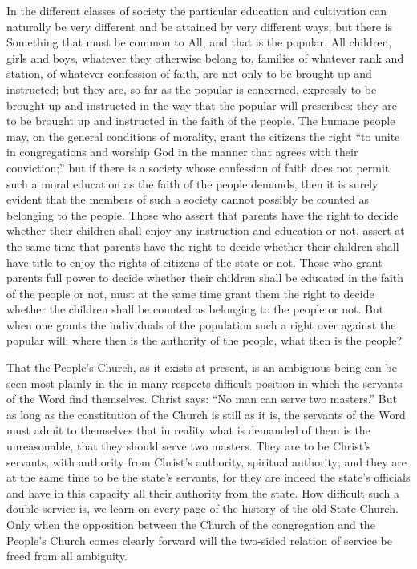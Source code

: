 \documentclass[12pt,a4paper,openany]{book}
\newcommand{\opage}[1]{\marginnote{\footnotesize\textit{[#1]}}}
\begin{document}
In the different classes of society the particular
education and cultivation can naturally be very different
and be attained by very different ways; but there
is Something that must be common to All, and that is the
popular. All children, girls and boys, whatever they otherwise belong to,
families of whatever rank and station,
of whatever confession of faith, are not only to be
brought up and instructed; but they are, so far as the popular
is concerned, expressly to be brought up and instructed in
the way that the popular will prescribes: they are to be brought up
and instructed in the faith of the people. The humane people
may, on the general conditions of morality, grant
the citizens the right ``to unite in congregations and
\setcounter{footnote}{0}%
\opage{111}worship God in the manner that agrees with their
conviction;'' but if there is a society whose
confession of faith does not permit such a moral education
as the faith of the people demands, then it is surely
evident that the members of such a society
cannot possibly be counted as belonging to the people. Those who assert that
parents have the right to decide whether their
children shall enjoy any instruction and education
or not, assert at the same time that parents have
the right to decide whether their children shall have
title to enjoy the rights of citizens of the state or
not. Those who grant parents full power to
decide whether their children shall be educated in the faith of the people
or not, must at the same time grant them the right to decide
whether the children shall be counted as belonging to the people or not.
But when one grants the individuals of the population such
a right over against the popular will: where then is
the authority of the people, what then is the people?

That the People's Church, as it exists at present,
is an ambiguous being can be seen most plainly
in the in many respects difficult position in which
the servants of the Word find themselves. Christ says: ``No man
can serve two masters.'' But as long as the constitution of the Church
is still as it is, the servants of the Word must
admit to themselves that in reality what is demanded of them
is the unreasonable, that they should serve two masters.
They are to be Christ's servants, with authority from
Christ's authority, spiritual authority; and they are at the
same time to be the state's servants, for they are indeed the state's
officials and have in this capacity all their authority
from the state. How difficult such a double service
is, we learn on every page of the history of the old
\setcounter{footnote}{0}%
\opage{112}State Church. Only when the opposition between
the Church of the congregation and the People's Church comes clearly forward
will the two-sided relation of service be freed from all
ambiguity.
\end{document}
